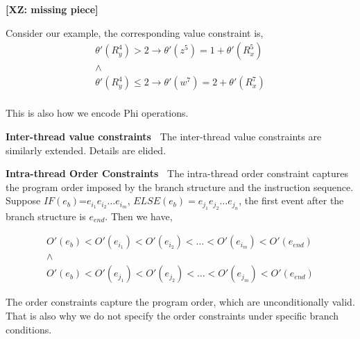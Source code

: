 {\bf [XZ: missing piece]}

Consider our example, the corresponding value constraint is, 
$$
\begin{array}{l}
\theta'(R^4_y)>2 \rightarrow \theta'(z^5)=1+\theta'(R^5_x) \\ 
\wedge  \\
\theta'(R^4_y)\leq 2 \rightarrow  \theta'(w^7)=2+\theta'(R^{7}_{x})\\
\end{array}
$$

This is also how we encode Phi operations.


{\bf Inter-thread value constraints\ } The inter-thread value constraints 
are similarly extended. Details are elided.


{\bf Intra-thread Order Constraints\ } The intra-thread order constraint captures the program order imposed by the branch structure and the instruction sequence. Suppose $IF(e_b)$=$e_{i_1}e_{i_2}\dots e_{i_m}$, $ELSE(e_b)=e_{j_1}e_{j_2}\dots e_{j_n}$, the first event after the branch structure is $e_{end}$. Then we have, 

$$
\begin{array}{l}
O'(e_b)<O'(e_{i_1})<O'(e_{i_2})<\dots <O'(e_{i_m})<O'(e_{end})\\
\wedge\\
O'(e_b)<O'(e_{j_1})<O'(e_{j_2})<\dots <O'(e_{j_m})<O'(e_{end})
\end{array}
$$

The order constraints capture the program order, which are unconditionally valid. That is also why we do not specify the order constraints under specific branch conditions. 





